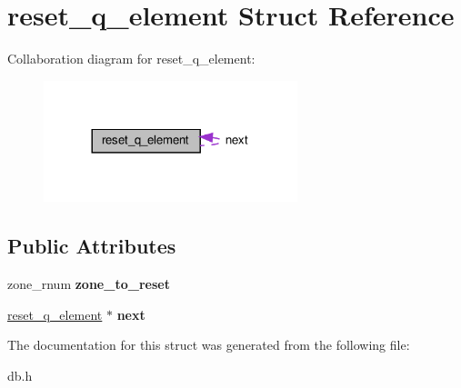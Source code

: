 \hypertarget{structreset__q__element}{}\section{reset\+\_\+q\+\_\+element Struct Reference}
\label{structreset__q__element}


Collaboration diagram for reset\+\_\+q\+\_\+element\+:
\nopagebreak
\begin{figure}[H]
\begin{center}
\leavevmode
\includegraphics[width=209pt]{structreset__q__element__coll__graph}
\end{center}
\end{figure}
\subsection*{Public Attributes}
\begin{DoxyCompactItemize}
\item 
\mbox{\label{structreset__q__element_ae66137cf094bfcd9a9f65124385ca7e9}} 
zone\+\_\+rnum {\bfseries zone\+\_\+to\+\_\+reset}
\item 
\mbox{\label{structreset__q__element_a72e569fcd97b41bfff3dde5ca6a74bde}} 
\hyperlink{structreset__q__element}{reset\+\_\+q\+\_\+element} $\ast$ {\bfseries next}
\end{DoxyCompactItemize}


The documentation for this struct was generated from the following file\+:\begin{DoxyCompactItemize}
\item 
db.\+h\end{DoxyCompactItemize}
